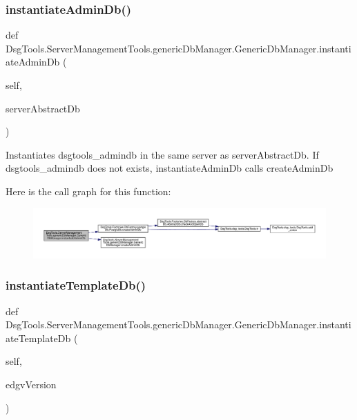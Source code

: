 \subsubsection{\texorpdfstring{instantiate\+Admin\+Db()}{instantiateAdminDb()}}
{\footnotesize\ttfamily def Dsg\+Tools.\+Server\+Management\+Tools.\+generic\+Db\+Manager.\+Generic\+Db\+Manager.\+instantiate\+Admin\+Db (\begin{DoxyParamCaption}\item[{}]{self,  }\item[{}]{server\+Abstract\+Db }\end{DoxyParamCaption})}

\begin{DoxyVerb}Instantiates dsgtools_admindb in the same server as serverAbstractDb. 
If dsgtools_admindb does not exists, instantiateAdminDb calls createAdminDb
\end{DoxyVerb}
 Here is the call graph for this function\+:
\nopagebreak
\begin{figure}[H]
\begin{center}
\leavevmode
\includegraphics[width=350pt]{class_dsg_tools_1_1_server_management_tools_1_1generic_db_manager_1_1_generic_db_manager_a2bb83de55a8a35f7f9f1d73482291b97_cgraph}
\end{center}
\end{figure}
\mbox{\label{class_dsg_tools_1_1_server_management_tools_1_1generic_db_manager_1_1_generic_db_manager_afdb4c9149490e8c8b751f0d15eb8a54d}} 
\subsubsection{\texorpdfstring{instantiate\+Template\+Db()}{instantiateTemplateDb()}}
{\footnotesize\ttfamily def Dsg\+Tools.\+Server\+Management\+Tools.\+generic\+Db\+Manager.\+Generic\+Db\+Manager.\+instantiate\+Template\+Db (\begin{DoxyParamCaption}\item[{}]{self,  }\item[{}]{edgv\+Version }\end{DoxyParamCaption})}

